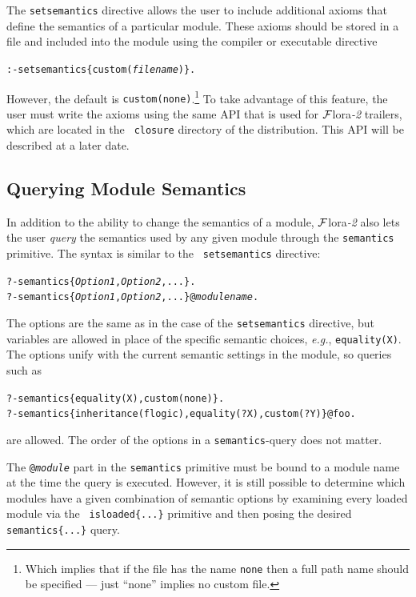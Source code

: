 \documentclass[11pt]{article}
\newcommand{\FLSYSTEM}{{\mbox{\sc ${\cal F}${lora}\rm\emph{-2}}}\xspace}
\begin{document}
The {\tt setsemantics} directive allows the user to include additional axioms
that define the semantics of a particular module. These axioms should be
stored in a file and included into the module using the compiler or
executable directive
\begin{alltt}
   :- setsemantics\{custom(\emph{filename})\}.  
\end{alltt}
However, the default is  {\tt custom(none)}.\footnote{
  Which implies that if the file has the name {\tt none} then a full path
  name should be specified --- just ``none'' implies no custom file.
}
To take advantage of this feature, the user must write the axioms using the
same API that is used for \FLSYSTEM trailers, which are located in the {\tt
  closure} directory of the distribution. This API will be described at a
later date.

\subsection{Querying Module Semantics}\label{sec-query-semantics}

In addition to the ability to change the semantics of a module, \FLSYSTEM also
lets the user \emph{query} the semantics used by any given module through
the {\tt semantics} primitive. The syntax is similar to the {\tt
  setsemantics} directive:
\begin{alltt}
   ?- semantics\{{\em Option1}, {\em Option2}, ...\}. \\
   ?- semantics\{{\em Option1}, {\em Option2}, ...\}@\emph{modulename}.
\end{alltt}
The options are the same as in the case of the {\tt setsemantics}
directive, but variables are allowed in place of the specific semantic
choices, {\it e.g.}, {\tt equality(X)}. The options unify with the current
semantic settings in the module, so queries such as 
\begin{alltt}
   ?- semantics\{equality(X), custom(none)\}. \\
   ?- semantics\{inheritance(flogic), equality(?X), custom(?Y)\}@foo.
\end{alltt}
are allowed. The order of the options in a {\tt semantics}-query does not
matter.

The {\tt @\emph{module}} part in the {\tt semantics} primitive must be
bound to a module name at the time the query is executed. However, it is
still possible to determine which modules have a given combination of
semantic options by examining every loaded module via the {\tt
  isloaded\{...\}} primitive and then posing the desired {\tt
  semantics\{...\}} query.
\end{document}
